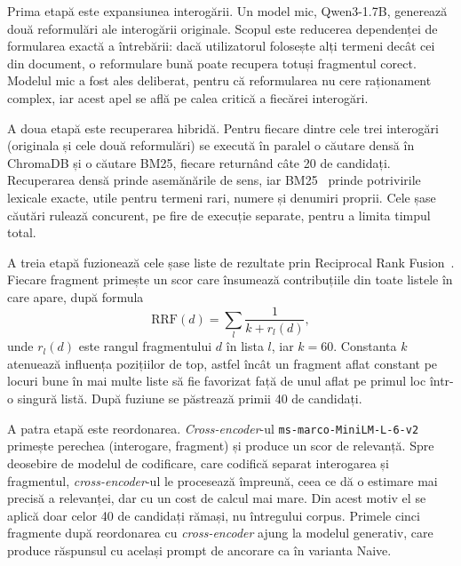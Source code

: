 Prima etapă este expansiunea interogării. Un model mic, Qwen3-1.7B, generează două reformulări ale interogării originale. Scopul este reducerea dependenței de formularea exactă a întrebării: dacă utilizatorul folosește alți termeni decât cei din document, o reformulare bună poate recupera totuși fragmentul corect. Modelul mic a fost ales deliberat, pentru că reformularea nu cere raționament complex, iar acest apel se află pe calea critică a fiecărei interogări.

A doua etapă este recuperarea hibridă. Pentru fiecare dintre cele trei interogări (originala și cele două reformulări) se execută în paralel o căutare densă în ChromaDB și o căutare BM25, fiecare returnând câte 20 de candidați. Recuperarea densă prinde asemănările de sens, iar BM25~\cite{robertson2009bm25} prinde potrivirile lexicale exacte, utile pentru termeni rari, numere și denumiri proprii. Cele șase căutări rulează concurent, pe fire de execuție separate, pentru a limita timpul total.

A treia etapă fuzionează cele șase liste de rezultate prin Reciprocal Rank Fusion~\cite{cormack2009rrf}. Fiecare fragment primește un scor care însumează contribuțiile din toate listele în care apare, după formula
\begin{equation}
\text{RRF}(d) = \sum_{l} \frac{1}{k + r_l(d)},
\label{eq:rrf}
\end{equation}
unde $r_l(d)$ este rangul fragmentului $d$ în lista $l$, iar $k=60$. Constanta $k$ atenuează influența pozițiilor de top, astfel încât un fragment aflat constant pe locuri bune în mai multe liste să fie favorizat față de unul aflat pe primul loc într-o singură listă. După fuziune se păstrează primii 40 de candidați.

A patra etapă este reordonarea. \textit{Cross-encoder}-ul \texttt{ms-marco-MiniLM-L-6-v2} primește perechea (interogare, fragment) și produce un scor de relevanță. Spre deosebire de modelul de codificare, care codifică separat interogarea și fragmentul, \textit{cross-encoder}-ul le procesează împreună, ceea ce dă o estimare mai precisă a relevanței, dar cu un cost de calcul mai mare. Din acest motiv el se aplică doar celor 40 de candidați rămași, nu întregului corpus. Primele cinci fragmente după reordonarea cu \textit{cross-encoder} ajung la modelul generativ, care produce răspunsul cu același prompt de ancorare ca în varianta Naive.

\afterpage{\blankpage}

